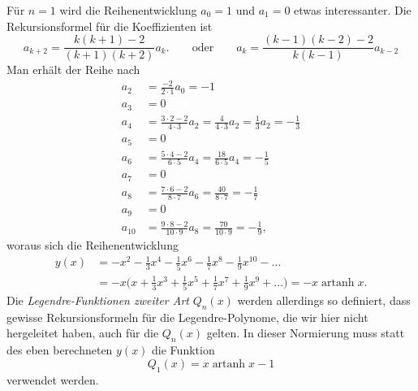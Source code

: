 Für $n=1$ wird die Reihenentwicklung $a_0=1$ und $a_1=0$ etwas
interessanter.
Die Rekursionsformel für die Koeffizienten ist
\[
a_{k+2}
=
\frac{k(k+1)-2}{(k+1)(k+2)} a_k.
\qquad\text{oder}\qquad
a_k
=
\frac{(k-1)(k-2)-2}{k(k-1)}
a_{k-2}
\]
Man erhält der Reihe nach
\begin{align*}
a_2 &= \frac{-2}{2\cdot 1} a_0 = -1
\\
a_3 &= 0
\\
a_4 &= \frac{3\cdot 2-2}{4\cdot 3} a_2 = \frac{4}{4\cdot 3}a_2 = \frac13a_2 = -\frac13
\\
a_5 &= 0
\\
a_6 &= \frac{5\cdot 4-2}{6\cdot 5}a_4 = \frac{18}{6\cdot 5}a_4 = -\frac15
\\
a_7 &= 0
\\
a_8 &= \frac{7\cdot 6-2}{8\cdot 7}a_6 = \frac{40}{8\cdot 7} = -\frac17
\\
a_9 &= 0
\\
a_{10} &= \frac{9\cdot 8-2}{10\cdot 9}a_8 = \frac{70}{10\cdot 9} = -\frac19,
\end{align*}
woraus sich die Reihenentwicklung
\begin{align*}
y(x)
&=
-x^2 -\frac13x^4 -\frac15x^6 - \frac17x^8 -\frac19x^{10}-\dots
\\
&=
-x\biggl(x+\frac13x^3 + \frac15x^5 + \frac17x^7 + \frac19x^9+\dots\biggr)
=
-x\operatorname{artanh}x.
\end{align*}
Die {\em Legendre-Funktionen zweiter Art} $Q_n(x)$  werden allerdings
so definiert, dass gewisse Rekursionsformeln für die Legendre-Polynome,
die wir hier nicht hergeleitet haben, auch für die $Q_n(x)$ gelten.
In dieser Normierung muss statt des eben berechneten $y(x)$ die Funktion
\[
Q_1(x) = x \operatorname{artanh}x-1
\]
verwendet werden.






